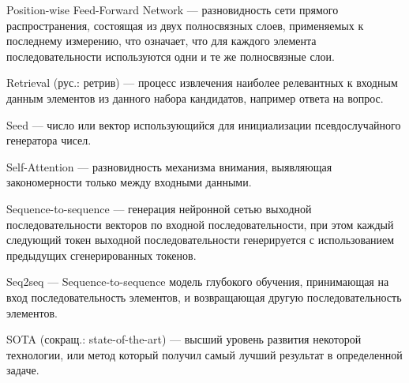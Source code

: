 Position-wise Feed-Forward Network --- разновидность сети прямого распространения, состоящая из двух полносвязных слоев, применяемых к последнему измерению, что означает, что для каждого элемента последовательности используются одни и те же полносвязные слои.

Retrieval (рус.: ретрив) --- процесс извлечения наиболее релевантных к входным данным элементов из данного набора кандидатов, например ответа на вопрос.

Seed --- число или вектор использующийся для инициализации псевдослучайного генератора чисел.

Self-Attention --- разновидность механизма внимания, выявляющая закономерности только между входными данными.

Sequence-to-sequence --- генерация нейронной сетью выходной последовательности векторов по входной последовательности, при этом каждый следующий токен выходной последовательности генерируется с использованием предыдущих сгенерированных токенов.

Seq2seq --- Sequence-to-sequence модель глубокого обучения, принимающая на вход последовательность элементов, и возвращающая другую последовательность элементов.

SOTA (сокращ.: state-of-the-art) --- высший уровень развития некоторой технологии, или метод который получил самый лучший результат в определенной задаче.
